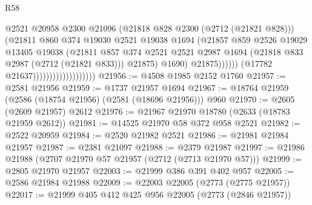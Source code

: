 \begin{lexlean}{R58}
\begin{coremodule}
                                                  @2521
                                                  @20958
                                                  @2300
                                                  @21096
                                                  (@21818 @828 @2300 (@2712 (@21821 @828)))
                                                  (@21811
                                                    @860
                                                    @374
                                                    @19030
                                                    @2521
                                                    @19038
                                                    @1694
                                                    (@21857
                                                      @859
                                                      @2526
                                                      @19029
                                                      @13405
                                                      @19038
                                                      (@21811
                                                        @857
                                                        @374
                                                        @2521
                                                        @2521
                                                        @2987
                                                        @1694
                                                        (@21818 @833 @2987 (@2712 (@21821 @833)))
                                                        @21875)
                                                      @1690)
                                                    @21875))))))
                                        (@17782 @21637)))))))))))))))))))
@21956 := @4508 @1985 @2152 @1760
@21957 := @2581 @21956
@21959 := @1737 @21957 @1694
@21967 := @18764 @21959 (@2586 (@18754 @21956) (@2581 (@18696 @21956))) @960
@21970 := @2605 (@2609 @21957) @2612
@21976 := @21967 @21970 @18780 (@2633 (@18783 @21959 @2612))
@21981 := @14525 @21970 @58 @372 @958 @2521
@21982 := @2522 @20959
@21984 := @2520 @21982 @2521
@21986 := @21981 @21984 @21957
@21987 := @2381 @21097
@21988 := @2379 @21987
@21997 := @21986 @21988 (@2707 @21970 @57 @21957 (@2712 (@2713 @21970 @57)))
@21999 := @2805 @21970 @21957
@22003 := @21999 @386 @391 @402 @957
@22005 := @2586 @21984 @21988
@22009 := @22003 @22005 (@2773 (@2775 @21957))
@22017 := @21999 @405 @412 @425 @956 @22005 (@2773 (@2846 @21957))

\end{coremodule}
\end{lexlean}
